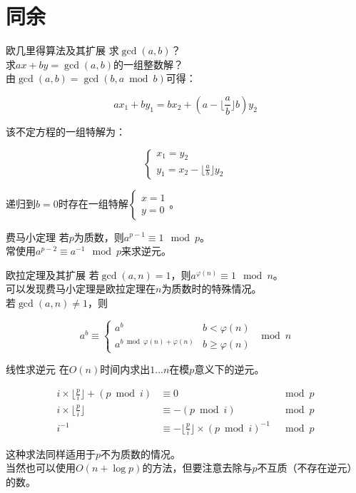 \documentclass{beamer}
\begin{document}
	\section{同余}
	\begin{frame}{欧几里得算法及其扩展}
		求$\gcd(a,b)$？
		\pause\\
		
		求$ax+by=\gcd(a,b)$的一组整数解？
		\pause\\
		
		由$\gcd(a,b)=\gcd(b,a \bmod b)$可得：
		
		$$ax_1+by_1=bx_2+(a-\lfloor\frac{a}{b}\rfloor b)y_2$$
		
		该不定方程的一组特解为：
		
		$$\begin{cases}
		x_1=y_2\\
		y_1=x_2-\lfloor\frac{a}{b}\rfloor y_2
		\end{cases}$$
		
		递归到$b=0$时存在一组特解$\begin{cases}x=1\\y=0\end{cases}$。
	\end{frame}
	\begin{frame}{费马小定理}
		若$p$为质数，则$a^{p-1} \equiv 1 \mod p$。
		\\
		
		常使用$a^{p-2}\equiv a^{-1} \mod p$来求逆元。
	\end{frame}
	\begin{frame}{欧拉定理及其扩展}
		若$\gcd(a,n)=1$，则$a^{\varphi(n)} \equiv 1 \mod n$。
		\\
		
		可以发现费马小定理是欧拉定理在$n$为质数时的特殊情况。
		\\
		
		若$\gcd(a,n)\neq 1$，则
		
		$$a^b\equiv\begin{cases}
		a^b &b < \varphi(n)\\
		a^{b \bmod \varphi(n)+\varphi(n)} &b \ge \varphi(n)
		\end{cases}
		\mod n$$
		
	\end{frame}
	\begin{frame}{线性求逆元}
		在$O(n)$时间内求出$1...n$在模$p$意义下的逆元。
		
		$$\begin{aligned}
		i\times \lfloor\frac{p}{i}\rfloor + (p \bmod i) &\equiv 0 &\mod p\\
		i\times \lfloor\frac{p}{i}\rfloor &\equiv -(p \bmod i) &\mod p\\
		i^{-1} &\equiv -\lfloor\frac{p}{i}\rfloor \times (p \bmod i)^{-1} &\mod p 
		\end{aligned}$$
		
		这种求法同样适用于$p$不为质数的情况。
		\\
		
		当然也可以使用$O(n+\log p)$的方法，但要注意去除与$p$不互质（不存在逆元）的数。
	\end{frame}
\end{document}
